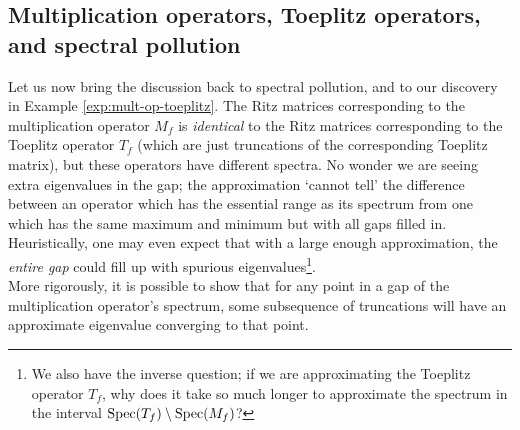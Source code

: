 \documentclass[../main.tex]{subfiles}
\begin{document}
\subsection{Multiplication operators, Toeplitz operators, and spectral pollution}
Let us now bring the discussion back to spectral pollution, and to our discovery
in Example \ref{exp:mult-op-toeplitz}. The Ritz matrices corresponding to the
multiplication operator $M_f$ is \emph{identical} to the Ritz matrices
corresponding to the Toeplitz operator $T_f$ (which are just truncations of the 
corresponding Toeplitz matrix), but these operators have different spectra. No
wonder we are seeing extra eigenvalues in the gap; the approximation `cannot
tell' the difference between an operator which has the essential range as its
spectrum from one which has the same maximum and minimum but with
all gaps filled in. Heuristically, one may even expect that with a large enough
approximation, the \emph{entire gap} could fill up with spurious
eigenvalues\footnote{We also have the inverse question; if we are approximating
the Toeplitz operator $T_f$, why does it take so much longer to 
approximate the spectrum in the interval $\mathrm{Spec}(T_f) \setminus \mathrm{Spec}(M_f)$?}.\\

More rigorously, it is possible to show that for any point in a gap of the
multiplication operator's spectrum, some subsequence of truncations will have an
approximate eigenvalue converging to that point. 
\end{document}
